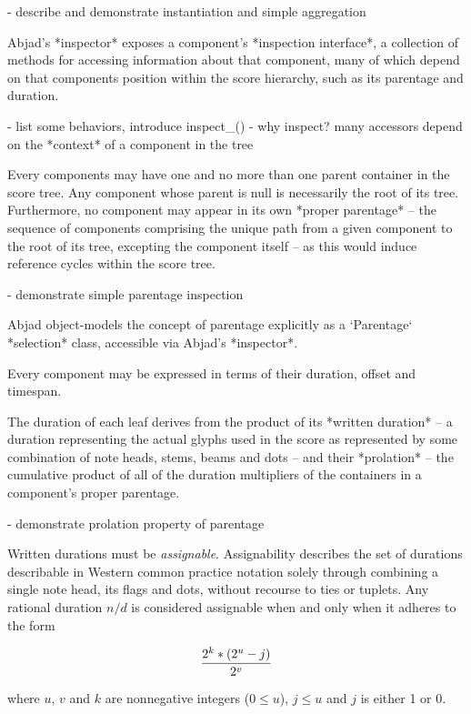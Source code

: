 \begin{markdown}
-   describe and demonstrate instantiation and simple aggregation

Abjad's *inspector* exposes a component's *inspection interface*, a
collection of methods for accessing information about that component, many of
which depend on that components position within the score hierarchy, such as
its parentage and duration.

-   list some behaviors, introduce inspect_()
-   why inspect? many accessors depend on the *context* of a component in the
    tree

Every components may have one and no more than one parent container in the
score tree. Any component whose parent is null is necessarily the root of its
tree. Furthermore, no component may appear in its own *proper parentage* -- the
sequence of components comprising the unique path from a given component to the
root of its tree, excepting the component itself -- as this would induce
reference cycles within the score tree.

-   demonstrate simple parentage inspection

Abjad object-models the concept of parentage explicitly as a `Parentage`
*selection* class, accessible via Abjad's *inspector*.

Every component may be expressed in terms of their duration, offset and
timespan.

The duration of each leaf derives from the product of its *written duration*
-- a duration representing the actual glyphs used in the score as represented
by some combination of note heads, stems, beams and dots -- and their
*prolation* -- the cumulative product of all of the duration multipliers of the
containers in a component's proper parentage.

-   demonstrate prolation property of parentage

\end{markdown}

Written durations must be \emph{assignable}. Assignability describes the set of
durations describable in Western common practice notation solely through
combining a single note head, its flags and dots, without recourse to ties or
tuplets. Any rational duration $n/d$ is considered assignable when and only
when it adheres to the form

\begin{equation}
{ 2^k * (2^u - j) \over 2^v }
\end{equation}

\noindent where $u$, $v$ and $k$ are nonnegative integers ($0 \leq u$), $j \leq
u$ and $j$ is either 1 or 0.

